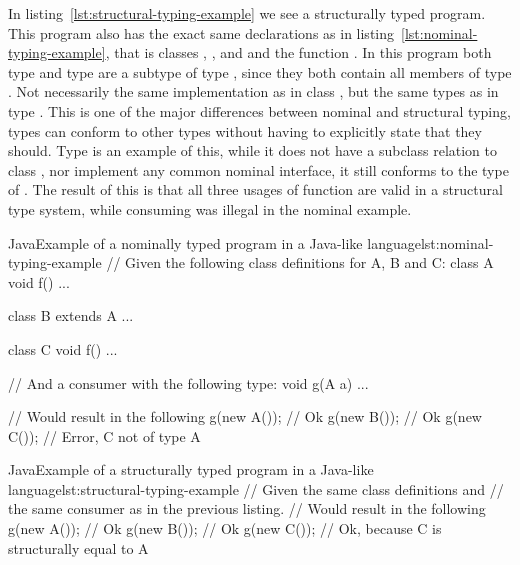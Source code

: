 In listing~\vref{lst:structural-typing-example} we see a structurally typed program.
This program also has the exact same declarations as in listing~\vref{lst:nominal-typing-example}, that is classes , , and  and the function .
In this program both type  and type  are a subtype of type , since they both contain all members of type .
Not necessarily the same implementation as in class , but the same types as in type .
This is one of the major differences between nominal and structural typing, types can conform to other types without having to explicitly state that they should.
Type  is an example of this, while it does not have a subclass relation to class , nor implement any common nominal interface, it still conforms to the type of .
The result of this is that all three usages of function  are valid in a structural type system, while consuming  was illegal in the nominal example.


\begin{code}{Java}{Example of a nominally typed program in a Java-like language}{lst:nominal-typing-example}
    // Given the following class definitions for A, B and C:
    class A {
        void f() {
            ...
        }
    }

    class B extends A {
        ...
    }

    class C {
        void f() {
            ...
        }
    }

    // And a consumer with the following type:
    void g(A a) { ... }

    // Would result in the following
    g(new A()); // Ok
    g(new B()); // Ok
    g(new C()); // Error, C not of type A
\end{code}

\begin{code}{Java}{Example of a structurally typed program in a Java-like language}{lst:structural-typing-example}
    // Given the same class definitions and
    // the same consumer as in the previous listing.
    // Would result in the following
    g(new A()); // Ok
    g(new B()); // Ok
    g(new C()); // Ok, because C is structurally equal to A
\end{code}
